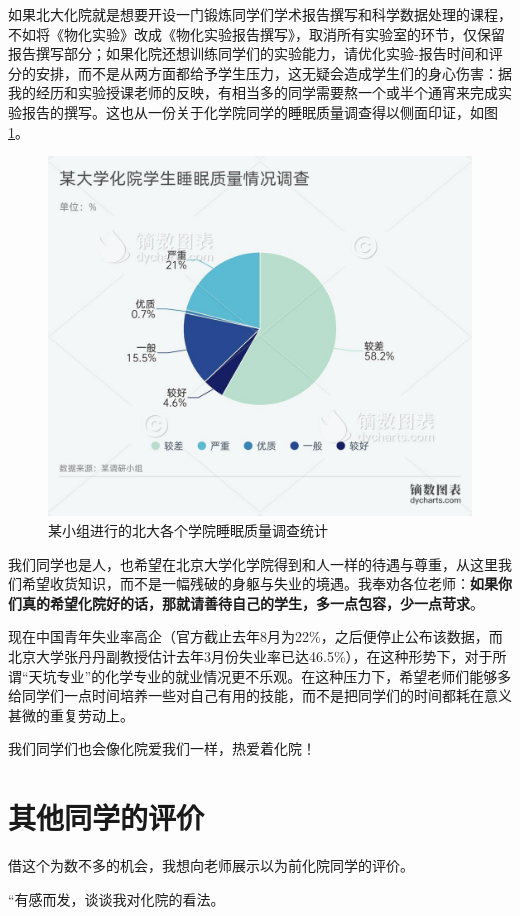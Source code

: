 如果北大化院就是想要开设一门锻炼同学们学术报告撰写和科学数据处理的课程，不如将《物化实验》改成《物化实验报告撰写》，取消所有实验室的环节，仅保留报告撰写部分；如果化院还想训练同学们的实验能力，请优化实验-报告时间和评分的安排，而不是从两方面都给予学生压力，这无疑会造成学生们的身心伤害：据我的经历和实验授课老师的反映，有相当多的同学需要熬一个或半个通宵来完成实验报告的撰写。这也从一份关于化学院同学的睡眠质量调查得以侧面印证，如图 \ref{fig:1}。

\begin{figure}[htbp]
    \centering
    \includegraphics[width=.7\textwidth]{figures/1.jpg}
    \caption{某小组进行的北大各个学院睡眠质量调查统计}
    \label{fig:1}
\end{figure}

我们同学也是人，也希望在北京大学化学院得到和人一样的待遇与尊重，从这里我们希望收货知识，而不是一幅残破的身躯与失业的境遇。我奉劝各位老师：\textbf{如果你们真的希望化院好的话，那就请善待自己的学生，多一点包容，少一点苛求}。

现在中国青年失业率高企（官方截止去年8月为22\%，之后便停止公布该数据，而北京大学张丹丹副教授估计去年3月份失业率已达46.5\%），在这种形势下，对于所谓“天坑专业”的化学专业的就业情况更不乐观。在这种压力下，希望老师们能够多给同学们一点时间培养一些对自己有用的技能，而不是把同学们的时间都耗在意义甚微的重复劳动上。

我们同学们也会像化院爱我们一样，热爱着化院！

\section{其他同学的评价}

借这个为数不多的机会，我想向老师展示以为前化院同学的评价。

“有感而发，谈谈我对化院的看法。

